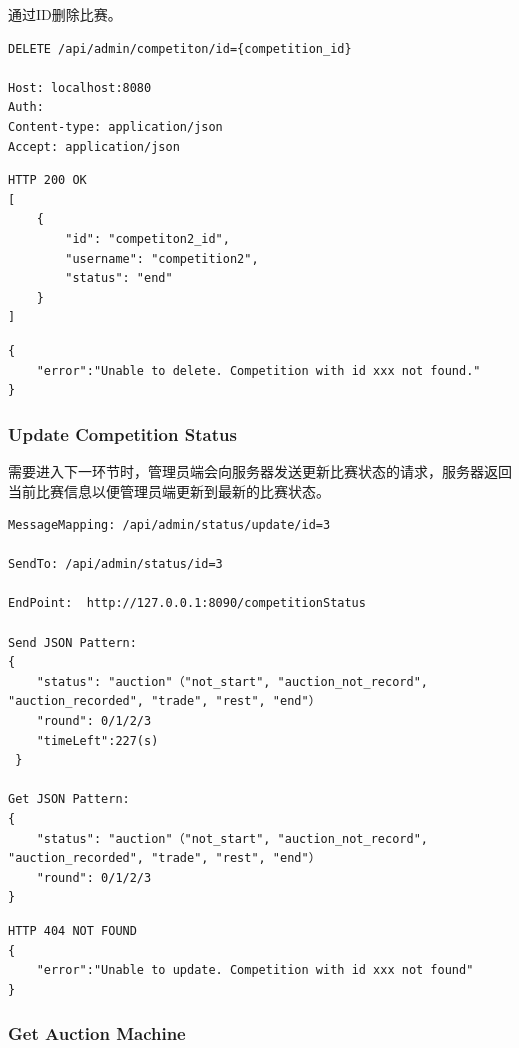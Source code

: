 \documentclass[12pt, a4paper,UTF8]{article}
\begin{document}
通过ID删除比赛。

\begin{lstlisting}
DELETE /api/admin/competiton/id={competition_id}

Host: localhost:8080
Auth:
Content-type: application/json
Accept: application/json
\end{lstlisting}

\begin{lstlisting}
HTTP 200 OK
[
    {
        "id": "competiton2_id",
        "username": "competition2",
        "status": "end"
    }
]
\end{lstlisting}

\begin{lstlisting}
{
    "error":"Unable to delete. Competition with id xxx not found."
}
\end{lstlisting}

\subsubsection{Update Competition Status}

需要进入下一环节时，管理员端会向服务器发送更新比赛状态的请求，服务器返回当前比赛信息以便管理员端更新到最新的比赛状态。

\begin{lstlisting}
MessageMapping: /api/admin/status/update/id=3
 
SendTo: /api/admin/status/id=3

EndPoint:  http://127.0.0.1:8090/competitionStatus

Send JSON Pattern:
{
    "status": "auction"（"not_start", "auction_not_record", "auction_recorded", "trade", "rest", "end"）
    "round": 0/1/2/3 
    "timeLeft":227(s)
 }

Get JSON Pattern: 
{
    "status": "auction"（"not_start", "auction_not_record", "auction_recorded", "trade", "rest", "end"）
    "round": 0/1/2/3
}
\end{lstlisting}

\begin{lstlisting}
HTTP 404 NOT FOUND
{
    "error":"Unable to update. Competition with id xxx not found"
}
\end{lstlisting}

\subsubsection{Get Auction Machine}
\end{document}
